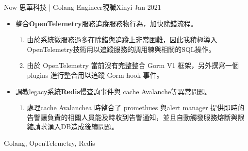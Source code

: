 %
%
%



\begin{experiences}
	\experience
	{Now}   {思華科技 | Golang Engineer}{現職}{Xinyi}
	{Jan 2021} {
                      \begin{itemize}
                      	\item 整合\textbf{OpenTelemetry}服務追蹤服務物行為，加快除錯流程。
                      		\begin{enumerate}                      	
                      			\item 由於系統微服務過多在除錯與追蹤上非常困難，因此我積極導入OpenTelemetry技術用以追蹤服務的調用練與相關的SQL操作。
                      			\item 由於 OpenTelemetry 當前沒有完整整合 Gorm  V1 框架，另外撰寫一個 plugins  進行整合用以追蹤  Gorm hook 事件。
                      		 \end{enumerate}
                      	\item 調教legacy系統\textbf{Redis}慢查詢事件與 cache Avalanche等異常問題。
	                      	\begin{enumerate}
        	              		\item 處理cache Avalanchea 時整合了  promethues  與alert manager 提供即時的告警讓負責的相關人員能及時收到告警通知，並且自動觸發服務熔斷與限縮請求湧入DB造成後續問題。
                      		\end{enumerate}
                      	\end{itemize}
                     }
                 {Golang, OpenTelemetry, Redis}
	\emptySeparator
	


\end{experiences}
